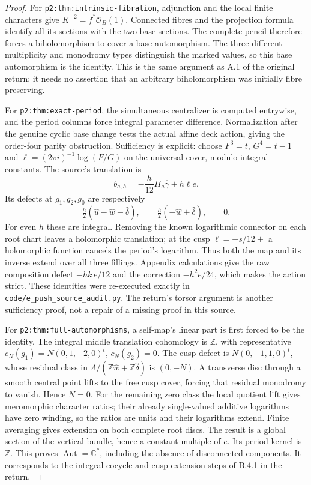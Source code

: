 \begin{proof}
For \texttt{p2:thm:intrinsic-fibration}, adjunction and the
local finite characters give $K^{-2}=f^*\mathcal O_B(1)$.
Connected fibres and the projection formula identify all its
sections with the two base sections.  The complete pencil
therefore forces a biholomorphism to cover a base automorphism.
The three different multiplicity and monodromy types distinguish
the marked values, so this base automorphism is the identity.
This is the same argument as A.1 of the original return; it
needs no assertion that an arbitrary biholomorphism was
initially fibre preserving.

For \texttt{p2:thm:exact-period}, the simultaneous centralizer
is computed entrywise, and the period columns force integral
parameter difference.  Normalization after the genuine cyclic
base change tests the actual affine deck action, giving the
order-four parity obstruction.  Sufficiency is explicit:
choose $F^3=t$, $G^4=t-1$ and
$\ell=(2\pi i)^{-1}\log(F/G)$ on the universal cover, modulo
integral constants.  The source's translation is
\[
 b_{a,h}=-\frac h{12}\Pi_a\widehat\gamma+h\ell e.
\]
Its defects at $g_1,g_2,g_0$ are respectively
\[
 \tfrac h2(\widehat u-\widehat w-\widehat\delta),\qquad
 \tfrac h2(-\widehat w+\widehat\delta),\qquad0.
\]
For even $h$ these are integral.  Removing the known logarithmic
connector on each root chart leaves a holomorphic translation;
at the cusp $\ell=-s/12+$ a holomorphic function cancels the
period's logarithm.  Thus both the map and its inverse extend
over all three fillings.  Appendix calculations give the raw
composition defect $-hk\,e/12$ and the correction
$-h^2e/24$, which makes the action strict.  These identities
were re-executed exactly in
\texttt{code/e\_push\_source\_audit.py}.  The return's torsor
argument is another sufficiency proof, not a repair of a
missing proof in this source.

For \texttt{p2:thm:full-automorphisms}, a self-map's linear
part is first forced to be the identity.  The integral middle
translation cohomology is $\mathbb Z$, with representative
$c_N(g_1)=N(0,1,-2,0)^t$, $c_N(g_2)=0$.
The cusp defect is $N(0,-1,1,0)^t$, whose residual class in
$\Lambda/(\mathbb Z\widehat w+\mathbb Z\widehat\delta)$ is
$(0,-N)$.  A transverse disc through a smooth central point
lifts to the free cusp cover, forcing that residual monodromy
to vanish.  Hence $N=0$.  For the remaining zero class the
local quotient lift gives meromorphic character ratios; their
already single-valued additive logarithms have zero winding,
so the ratios are units and their logarithms extend.  Finite
averaging gives extension on both complete root discs.  The
result is a global section of the vertical bundle, hence a
constant multiple of $e$.  Its period kernel is $\mathbb Z$.
This proves $\operatorname{Aut}=\mathbb C^*$, including the
absence of disconnected components.  It corresponds to the
integral-cocycle and cusp-extension steps of B.4.1 in the return.


\end{proof}

